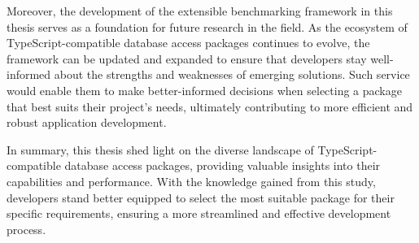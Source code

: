 Moreover, the development of the extensible benchmarking framework in this
thesis serves as a foundation for future research in the field. As the ecosystem
of TypeScript-compatible database access packages continues to evolve, the
framework can be updated and expanded to ensure that developers stay
well-informed about the strengths and weaknesses of emerging solutions. Such
service would enable them to make better-informed decisions when selecting a
package that best suits their project's needs, ultimately contributing to more
efficient and robust application development.

In summary, this thesis shed light on the diverse landscape of
TypeScript-compatible database access packages, providing valuable insights into
their capabilities and performance. With the knowledge gained from this study,
developers stand better equipped to select the most suitable package for their
specific requirements, ensuring a more streamlined and effective development
process.